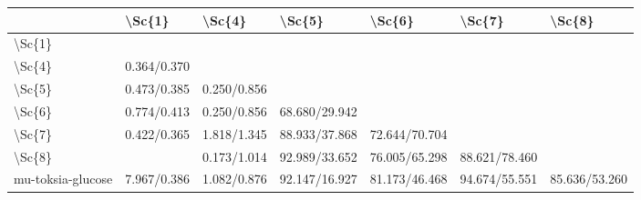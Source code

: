 \begin{tabular}{lllllll}
\toprule
{} &       \textbackslash Sc\{1\} &       \textbackslash Sc\{4\} &         \textbackslash Sc\{5\} &         \textbackslash Sc\{6\} &         \textbackslash Sc\{7\} &         \textbackslash Sc\{8\} \\
\midrule
\textbackslash Sc\{1\}            &              &              &                &                &                &                \\
\textbackslash Sc\{4\}            &  0.364/0.370 &              &                &                &                &                \\
\textbackslash Sc\{5\}            &  0.473/0.385 &  0.250/0.856 &                &                &                &                \\
\textbackslash Sc\{6\}            &  0.774/0.413 &  0.250/0.856 &  68.680/29.942 &                &                &                \\
\textbackslash Sc\{7\}            &  0.422/0.365 &  1.818/1.345 &  88.933/37.868 &  72.644/70.704 &                &                \\
\textbackslash Sc\{8\}            &              &  0.173/1.014 &  92.989/33.652 &  76.005/65.298 &  88.621/78.460 &                \\
mu-toksia-glucose &  7.967/0.386 &  1.082/0.876 &  92.147/16.927 &  81.173/46.468 &  94.674/55.551 &  85.636/53.260 \\
\bottomrule
\end{tabular}
